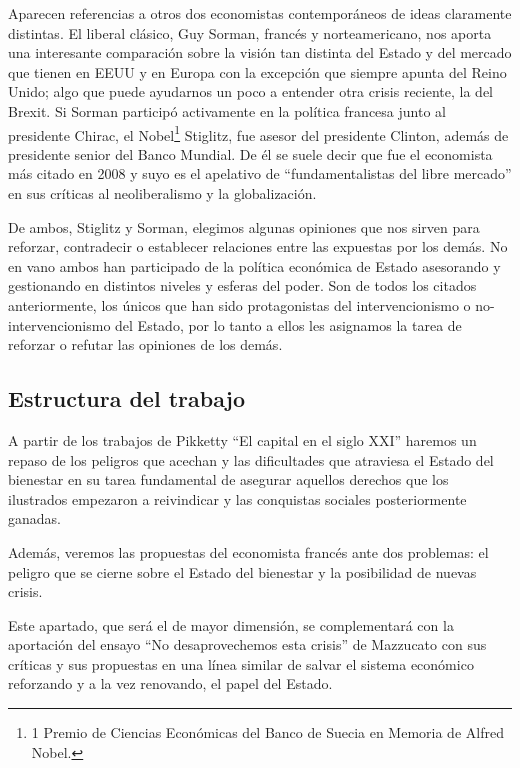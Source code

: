 \documentclass[
]{article}
\begin{document}
Aparecen referencias a otros dos economistas contemporáneos de ideas
claramente distintas. El liberal clásico, Guy Sorman, francés y
norteamericano, nos aporta una interesante comparación sobre la visión
tan distinta del Estado y del mercado que tienen en EEUU y en Europa con
la excepción que siempre apunta del Reino Unido; algo que puede
ayudarnos un poco a entender otra crisis reciente, la del Brexit. Si
Sorman participó activamente en la política francesa junto al presidente
Chirac, el Nobel\footnote{1 Premio de Ciencias Económicas del Banco de
  Suecia en Memoria de Alfred Nobel.} Stiglitz, fue asesor del
presidente Clinton, además de presidente senior del Banco Mundial. De él
se suele decir que fue el economista más citado en 2008 y suyo es el
apelativo de ``fundamentalistas del libre mercado'' en sus críticas al
neoliberalismo y la globalización.

De ambos, Stiglitz y Sorman, elegimos algunas opiniones que nos sirven
para reforzar, contradecir o establecer relaciones entre las expuestas
por los demás. No en vano ambos han participado de la política económica
de Estado asesorando y gestionando en distintos niveles y esferas del
poder. Son de todos los citados anteriormente, los únicos que han sido
protagonistas del intervencionismo o no-intervencionismo del Estado, por
lo tanto a ellos les asignamos la tarea de reforzar o refutar las
opiniones de los demás.

\hypertarget{estructura-del-trabajo}{%
\subsection{Estructura del trabajo}\label{estructura-del-trabajo}}

A partir de los trabajos de Pikketty ``El capital en el siglo XXI''
haremos un repaso de los peligros que acechan y las dificultades que
atraviesa el Estado del bienestar en su tarea fundamental de asegurar
aquellos derechos que los ilustrados empezaron a reivindicar y las
conquistas sociales posteriormente ganadas.

Además, veremos las propuestas del economista francés ante dos
problemas: el peligro que se cierne sobre el Estado del bienestar y la
posibilidad de nuevas crisis.

Este apartado, que será el de mayor dimensión, se complementará con la
aportación del ensayo ``No desaprovechemos esta crisis'' de Mazzucato
con sus críticas y sus propuestas en una línea similar de salvar el
sistema económico reforzando y a la vez renovando, el papel del Estado.
\end{document}
